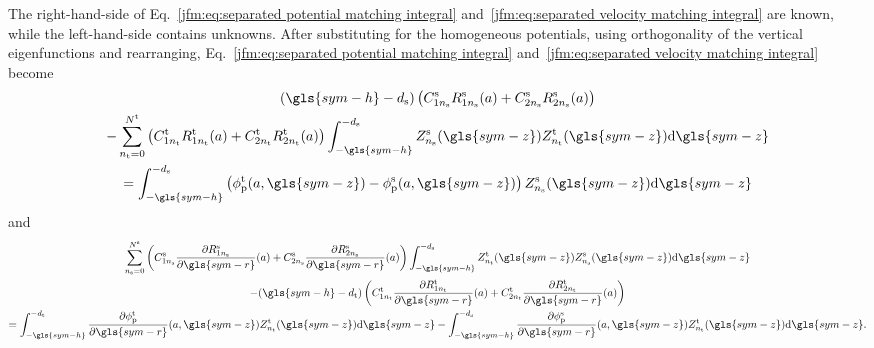 \documentclass[ASNA,twocolumn]{USG} %
\begin{document}
The right-hand-side of Eq.~\ref{jfm:eq:separated potential matching integral} and~\ref{jfm:eq:separated velocity matching integral} are known, while the left-hand-side contains unknowns.
After substituting for the homogeneous potentials, using orthogonality of the vertical eigenfunctions and rearranging,
Eq.~\ref{jfm:eq:separated potential matching integral} and~\ref{jfm:eq:separated velocity matching integral} become
\begin{multline}\label{jfm:eq:separated potential matching integral simplified}
    (\gls{sym-h}-d_\mathrm{s})
        \left(
            C^\mathrm{s}_{1n_\mathrm{s}} R_{1n_\mathrm{s}}^\mathrm{s}(a) + 
            C^\mathrm{s}_{2n_\mathrm{s}} R_{2n_\mathrm{s}}^\mathrm{s}(a)
        \right) \\ 
    -\sum _{n_\mathrm{t} = 0}^{N^\mathrm{t}}
    \left(
        C^\mathrm{t}_{1n_\mathrm{t}} R_{1n_\mathrm{t}}^\mathrm{t}(a) +
        C^\mathrm{t}_{2n_\mathrm{t}} R_{2n_\mathrm{t}}^\mathrm{t}(a)
    \right)
    \int_{-\gls{sym-h}}^{-d_\mathrm{s}}
    Z^\mathrm{s}_{n_\mathrm{s}}(\gls{sym-z})
    Z_{n_\mathrm{t}}^\mathrm{t}(\gls{sym-z})
    \mathrm{d}\gls{sym-z} \\ 
    =\int_{-\gls{sym-h}}^{-d_\mathrm{s}}
        \left(
            \phi_\mathrm{p}^\mathrm{t}(a,\gls{sym-z}) -
            \phi_\mathrm{p}^\mathrm{s}(a,\gls{sym-z})
        \right)
    Z^\mathrm{s}_{n_\mathrm{s}}(\gls{sym-z})
    \mathrm{d}\gls{sym-z}
\end{multline}
and
\begin{multline}\label{jfm:eq:separated velocity matching integral simplified}
    \sum _{n_\mathrm{s} = 0}^{N^\mathrm{s}}
    \left(
        C^\mathrm{s}_{1n_\mathrm{s}}
        \frac{
                \partial R_{1n_\mathrm{s}}^\mathrm{s}
            }
            {
                \partial \gls{sym-r}
            }(a)+ 
        C^\mathrm{s}_{2n_\mathrm{s}}
        \frac{
                \partial R_{2n_\mathrm{s}}^\mathrm{s}
            }
            {
                \partial \gls{sym-r}
            }(a)
    \right)
    \int_{-\gls{sym-h}}^{-d_\mathrm{s}}
        Z^\mathrm{t}_{n_\mathrm{t}}(\gls{sym-z})
        Z_{n_\mathrm{s}}^\mathrm{s}(\gls{sym-z})
        \mathrm{d}\gls{sym-z}
    \\
    - (\gls{sym-h}-d_\mathrm{t})
    \left(
        C^\mathrm{t}_{1n_\mathrm{t}} \frac{\partial R_{1n_\mathrm{t}}^\mathrm{t}}{\partial \gls{sym-r}}(a) +
        C^\mathrm{t}_{2n_\mathrm{t}} \frac{\partial R_{2n_\mathrm{t}}^\mathrm{t}}{\partial \gls{sym-r}}(a)
    \right)
    \\= 
    \int_{-\gls{sym-h}}^{-d_\mathrm{t}}
    \frac{
            \partial \phi_\mathrm{p}^\mathrm{t}
        }
        {
            \partial \gls{sym-r}
        }(a,\gls{sym-z})
        Z^\mathrm{t}_{n_\mathrm{t}}(\gls{sym-z})
        \mathrm{d}\gls{sym-z}
    -\int_{-\gls{sym-h}}^{-d_\mathrm{s}}
    \frac{
            \partial \phi_\mathrm{p}^\mathrm{s}
        }
        {
            \partial \gls{sym-r}
        }(a,\gls{sym-z})
        Z^\mathrm{t}_{n_\mathrm{t}}(\gls{sym-z})
        \mathrm{d}\gls{sym-z}.
\end{multline}
\end{document}
